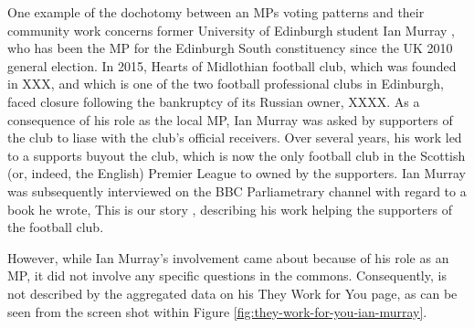 One example of the dochotomy between an MPs voting patterns and their community work concerns former University of Edinburgh student Ian Murray \cite{ian-murray}, who has been the MP for the Edinburgh South constituency since the UK 2010 general election. 
In 2015, Hearts of Midlothian football club, which was founded in XXX, and which is one of the two football professional clubs in Edinburgh, faced closure following the bankruptcy of its Russian owner, XXXX.
As a consequence of his role as the local MP, Ian Murray was asked by supporters of the club to liase with the club's official receivers.
Over several years, his work led to a supports buyout the club, which is now the only football club in the Scottish (or, indeed, the English) Premier League to owned by the supporters.
Ian Murray was subsequently interviewed \cite{ian-murray-bbc} on the BBC Parliametrary channel \cite{bbc-parliament} with regard to a book he wrote, This is our story \cite{ian-murray-this-is-our-story}, describing his work helping the supporters of the football club.

However, while Ian Murray’s involvement came about because of his role as an MP, it did not involve any specific questions in the commons.
Consequently, is not described by the aggregated data on his They Work for You page, as can be seen from the screen shot within Figure \ref{fig:they-work-for-you-ian-murray}.
